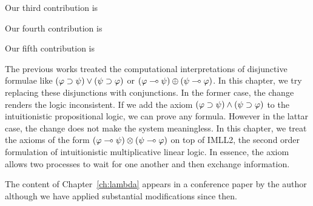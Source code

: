 Our third contribution is

Our fourth contribution is

Our fifth contribution is

The previous works treated the computational interpretations of
disjunctive formulae like $(\varphi\supset\psi)\lor(\psi\supset\varphi)$ or
$(\varphi\multimap\psi)\oplus(\psi\multimap\varphi)$.  In this chapter, we try
replacing these disjunctions with conjunctions.
In the former case, the change renders the logic inconsistent.
If we add the axiom $(\varphi\supset\psi)\land(\psi\supset\varphi)$ to the
intuitionistic propositional logic,
we can prove any formula.  However in the lattar case, the change does
not make the system meaningless.
In this chapter, we treat
the axioms of the form $(\varphi\multimap\psi)\otimes(\psi\multimap\varphi)$
on top of IMLL2, the second order formulation of intuitionistic
multiplicative linear
logic.  In essence, the axiom allows two processes to wait for one
another and then exchange information.

The content of Chapter~\ref{ch:lambda} appears in
a conference paper by the author \citep{hiraiflops2012}
although we have applied substantial modifications since then.





